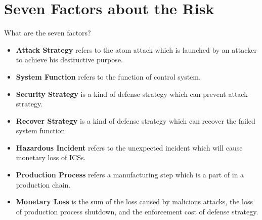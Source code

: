 \documentclass[10pt]{beamer}
\begin{document}
\section{Seven Factors about the Risk}
\begin{frame}{What are the seven factors?}
\vspace{10pt}\hspace{-30pt}
\begin{minipage}{1.12\textwidth}
    \begin{itemize}[<+->]
      \item \textbf{Attack Strategy} refers to the atom attack which is launched by an attacker to achieve his destructive purpose.
      \item \textbf{System Function} refers to the function of control system.
      \item \textbf{Security Strategy} is a kind of defense strategy which can prevent attack strategy.
      \item \textbf{Recover Strategy} is a kind of defense strategy which can recover the failed system function.
      \item \textbf{Hazardous Incident} refers to the unexpected incident which will cause monetary loss of ICSs.
      \item \textbf{Production Process} refers a manufacturing step which is a part of in a production chain.
      \item \textbf{Monetary Loss} is the sum of the loss caused by malicious attacks, the loss of production process shutdown, and the enforcement cost of defense strategy.
    \end{itemize}
\end{minipage}
\end{frame}
\end{document}
